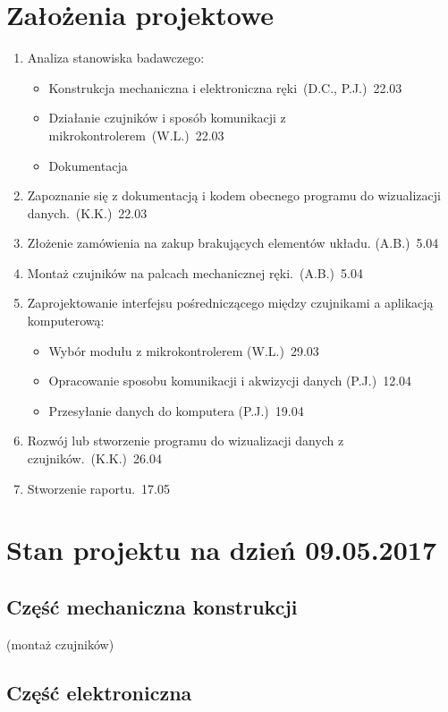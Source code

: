 \documentclass[a4paper,12pt]{article}
\begin{document}
	\section{Założenia projektowe}
		\begin{enumerate}
			\item Analiza stanowiska badawczego:
				\begin{itemize}
					\item Konstrukcja mechaniczna i elektroniczna ręki~(D.C., P.J.)~22.03
					\item Działanie czujników i sposób komunikacji z mikrokontrolerem~(W.L.)~22.03
					\item Dokumentacja
				\end{itemize}
			\item Zapoznanie się z dokumentacją i kodem obecnego programu do wizualizacji danych.~(K.K.)~22.03
			\item Złożenie zamówienia na zakup brakujących elementów układu. (A.B.)~5.04
			\item Montaż czujników na palcach mechanicznej ręki.~(A.B.)~5.04
			\item Zaprojektowanie interfejsu pośredniczącego między czujnikami a aplikacją komputerową:
				\begin{itemize}
					\item Wybór modułu z mikrokontrolerem (W.L.)~29.03
					\item Opracowanie sposobu komunikacji i akwizycji danych (P.J.)~12.04
					\item Przesyłanie danych do komputera (P.J.)~19.04
				\end{itemize}
			\item Rozwój lub stworzenie programu do wizualizacji danych z czujników.~(K.K.)~26.04
			\item Stworzenie raportu.~17.05
	\end{enumerate}
	
	\section{Stan projektu na dzień 09.05.2017}
		\subsection{Część mechaniczna konstrukcji}
		(montaż czujników)
		\subsection{Część elektroniczna}
\end{document}
